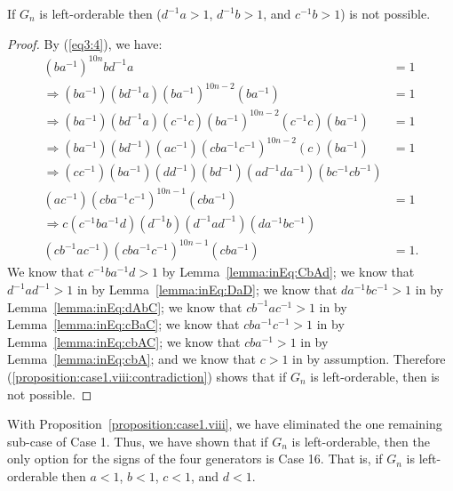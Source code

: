 \begin{proposition}
If $G_{n}$ is left-orderable then  ($d^{-1}a > 1$, $d^{-1}b>1$, and $c^{-1}b>1$) is not possible.
\label{proposition:case1.viii}
\end{proposition}
\begin{proof} By (\ref{eq3:4}), we have:
\begin{align}
(ba^{-1})^{10n}bd^{-1}a&=1\nonumber{}\\
\Rightarrow{}(ba^{-1})(bd^{-1}a)(ba^{-1})^{10n-2}(ba^{-1})&=1\nonumber{}\\
\Rightarrow{}(ba^{-1})(bd^{-1}a)(c^{-1}c)(ba^{-1})^{10n-2}(c^{-1}c)(ba^{-1})&=1\nonumber{}\\
\Rightarrow{}(ba^{-1})(bd^{-1})(ac^{-1})(cba^{-1}c^{-1})^{10n-2}(c)(ba^{-1})&=1\nonumber{}\\
\Rightarrow{}(cc^{-1})(ba^{-1})(dd^{-1})(bd^{-1})(ad^{-1}da^{-1})(bc^{-1}cb^{-1})\nonumber{}\\
(ac^{-1})(cba^{-1}c^{-1})^{10n-1}(cba^{-1})&=1\nonumber{}\\
\Rightarrow{}c(c^{-1}ba^{-1}d)(d^{-1}b)(d^{-1}ad^{-1})(da^{-1}bc^{-1})\nonumber{}\\
(cb^{-1}ac^{-1})(cba^{-1}c^{-1})^{10n-1}(cba^{-1})&=1.\label{proposition:case1.viii:contradiction}
\end{align}
We know that $c^{-1}ba^{-1}d>1$ by Lemma~\ref{lemma:inEq:CbAd}; we know that $d^{-1}ad^{-1}>1$ in  by Lemma~\ref{lemma:inEq:DaD}; we know that $da^{-1}bc^{-1}>1$ in  by Lemma~\ref{lemma:inEq:dAbC}; we know that $cb^{-1}ac^{-1}>1$ in  by Lemma~\ref{lemma:inEq:cBaC}; we know that $cba^{-1}c^{-1}>1$ in  by Lemma~\ref{lemma:inEq:cbAC}; we know that $cba^{-1}>1$ in  by Lemma~\ref{lemma:inEq:cbA}; and we know that $c>1$ in  by assumption. Therefore (\ref{proposition:case1.viii:contradiction}) shows that if $G_n$ is left-orderable, then  is not possible.
\end{proof}



\noindent{}With Proposition~\ref{proposition:case1.viii}, we have eliminated the one remaining sub-case of Case 1. Thus, we have shown that if $G_n$ is left-orderable, then the only option for the signs of the four generators is Case 16. That is, if $G_n$ is left-orderable then $a<1$, $b<1$, $c<1$, and $d<1$.
